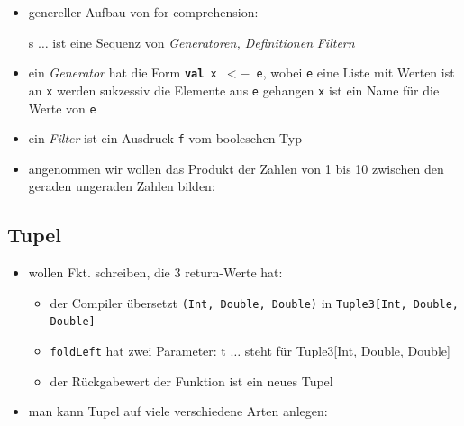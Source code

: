 \begin{itemize}
\begin{itemize}
    
    
    \item genereller Aufbau von for-comprehension:
    
    \begin{shadowminipage}
    
    \end{shadowminipage}
    
    
    s $\ldots$ ist eine Sequenz von \textit{Generatoren, Definitionen}
    \und \textit{Filtern}
    \item ein \textit{Generator} hat die Form 
    \texttt{\textbf{val} x $<-$ e}, wobei
    \texttt{e} eine Liste mit Werten ist \und an \texttt{x} 
    werden sukzessiv die Elemente aus \texttt{e} gehangen
    \texttt{x} ist ein Name für die Werte von \texttt{e}
    \item ein \textit{Filter} ist ein Ausdruck \texttt{f} vom 
    booleschen Typ
    \item angenommen wir wollen das Produkt der Zahlen von 1 bis 10
    zwischen den geraden \und ungeraden Zahlen bilden:
    
    
 
  \end{itemize}
\end{itemize}


\subsection{Tupel}
\begin{itemize}
  \item wollen Fkt. schreiben, die 3 return-Werte hat:
  
  
  
  \begin{itemize}
    \item der Compiler übersetzt \texttt{(Int, Double, Double)} in
    \texttt{Tuple3[Int, Double, Double]}
    \item \texttt{foldLeft} hat zwei Parameter: t $\ldots$ steht für 
    Tuple3[Int, Double, Double]
    \item der Rückgabewert der Funktion ist ein neues Tupel
  \end{itemize}
  \item man kann Tupel auf viele verschiedene Arten anlegen:
  
  
\end{itemize}


